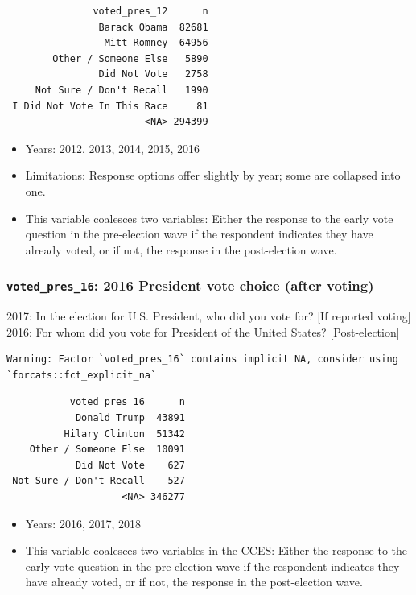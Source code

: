 \documentclass[10pt,article,oneside]{memoir}
\theoremstyle{definition}
\begin{document}
\begin{verbatim}
               voted_pres_12      n
                Barack Obama  82681
                 Mitt Romney  64956
        Other / Someone Else   5890
                Did Not Vote   2758
     Not Sure / Don't Recall   1990
 I Did Not Vote In This Race     81
                        <NA> 294399
\end{verbatim}

\begin{itemize}
\tightlist
\item
  Years: 2012, 2013, 2014, 2015, 2016
\item
  Limitations: Response options offer slightly by year; some are
  collapsed into one.
\item
  This variable coalesces two variables: Either the response to the
  early vote question in the pre-election wave if the respondent
  indicates they have already voted, or if not, the response in the
  post-election wave.
\end{itemize}

\hypertarget{voted_pres_16-2016-president-vote-choice-after-voting}{%
\subsubsection{\texorpdfstring{\texttt{voted\_pres\_16}: 2016 President
vote choice (after
voting)}{voted\_pres\_16: 2016 President vote choice (after voting)}}\label{voted_pres_16-2016-president-vote-choice-after-voting}}

2017: In the election for U.S. President, who did you vote for? {[}If
reported voting{]} 2016: For whom did you vote for President of the
United States? {[}Post-election{]}

\begin{verbatim}
Warning: Factor `voted_pres_16` contains implicit NA, consider using
`forcats::fct_explicit_na`
\end{verbatim}

\begin{verbatim}
           voted_pres_16      n
            Donald Trump  43891
          Hilary Clinton  51342
    Other / Someone Else  10091
            Did Not Vote    627
 Not Sure / Don't Recall    527
                    <NA> 346277
\end{verbatim}

\begin{itemize}
\tightlist
\item
  Years: 2016, 2017, 2018
\item
  This variable coalesces two variables in the CCES: Either the response
  to the early vote question in the pre-election wave if the respondent
  indicates they have already voted, or if not, the response in the
  post-election wave.
\end{itemize}
\end{document}
